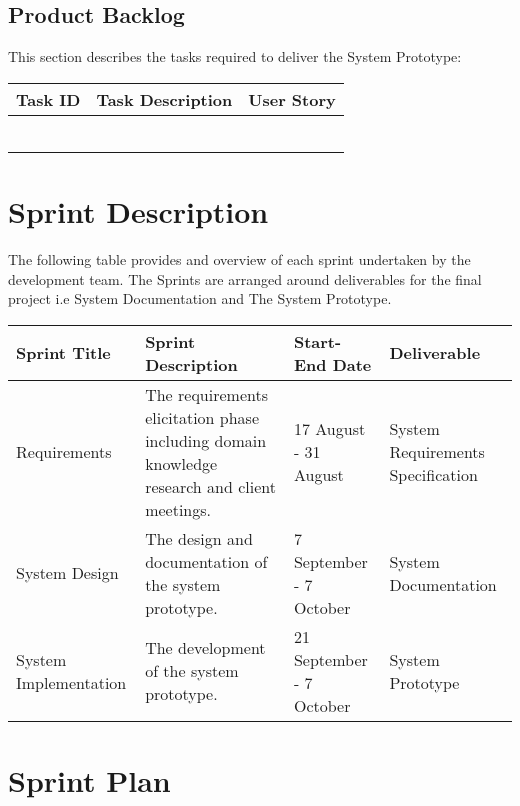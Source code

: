 \documentclass[11pt]{article}
\begin{document}
\subsection{Product Backlog}
This section describes the tasks required to deliver the System Prototype:
\begin{table}[H]
	\begin{tabular}{@{}|l|l|l|@{}}
		\toprule
		Task ID & Task Description & User Story \\ \midrule
				&           &     \\ \midrule
				&           &     \\ \midrule
				&           &     \\ \midrule
				&           &     \\ \midrule
				&           &     \\ \midrule
		
				&           &     \\ \bottomrule
	\end{tabular}
\end{table}

\section{Sprint Description}
The following table provides and overview of each sprint undertaken by the development team. The Sprints are arranged around deliverables for the final project i.e System Documentation and The System Prototype.
\begin{table}[H]
	\hskip-4.0cm\begin{tabular}[\textwidth]{@{}|l|l|l|l|@{}}
		\toprule
		Sprint Title & Sprint Description & Start-End Date & Deliverable \\ \midrule
		Requirements & \begin{minipage}{0.3\textwidth}
		The requirements elicitation phase including domain knowledge research and client meetings.
		\end{minipage} & 17 August - 31 August & System Requirements Specification \\ \midrule
	System Design	&  \begin{minipage}{0.3\textwidth}
		The design and documentation of the system prototype.
	\end{minipage} & 7 September - 7 October & System Documentation\\ \midrule
	System Implementation  &\begin{minipage}{0.3\textwidth}
		The development of the system prototype.
	\end{minipage}  & 21 September - 7 October & System Prototype\\ \bottomrule
	\end{tabular}
\end{table}

\section{Sprint Plan}
\end{document}

